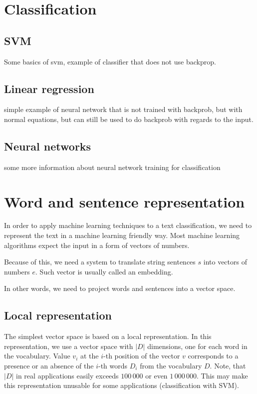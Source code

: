 \section{Classification}
    
    \subsection{SVM}
    
        \* %
        Some basics of svm, example of classifier that does not use backprop.
    
    \subsection{Linear regression}
    
        simple example of neural network that is not trained with backprob, but with normal equations,  
        but can still be used to do backprob with regards to the input.
    
    \subsection{Neural networks}
    
        some more information about neural network training for classification

    
\section{Word and sentence representation}

    In order to apply machine learning techniques to a text classification, 
    we need to represent the text in a machine learning friendly way.
    Most machine learning algorithms expect the input in a form of vectors of numbers. 
    
    Because of this, we need a system to translate string sentences $s$ into vectors of numbers $e$.
    Such vector is usually called an embedding. 
    
    In  other words, we need to project words and sentences into a vector space.
    
    \subsection{Local representation}
    
    The simplest vector space is based on a local representation.
    In this representation, we use a vector space with $|D|$ dimensions, one for each word in the vocabulary.
    Value $v_i$ at the $i$-th position of the vector $v$ corresponds to a presence or an absence of the $i$-th words $D_i$ from the vocabulary $D$.
    Note, that $|D|$ in real applications easily exceeds $100\,000$ or even $1\,000\,000$.
    This may make this representation unusable for some applications (classification with SVM).
    
